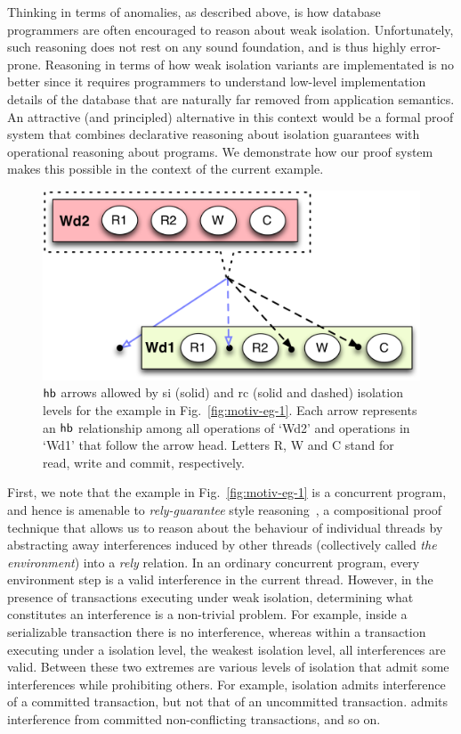 Thinking in terms of anomalies, as described above, is how database
programmers are often encouraged to reason about weak isolation.
Unfortunately, such reasoning does not rest on any sound foundation,
and is thus highly error-prone. Reasoning in terms of how weak
isolation variants are implementated is no better since it requires
programmers to understand low-level implementation details of the
database that are naturally far removed from application semantics. An
attractive (and principled) alternative in this context would be a
formal proof system that combines declarative reasoning about
isolation guarantees with operational reasoning about programs. We
demonstrate how our proof system makes this possible in the context of
the current example.

\begin{figure}
\centering
  \includegraphics[scale=0.4]{Figures/motiv-eg-1-hb}

\caption{$\textsf{hb}$ arrows allowed by {\sc si} (solid) and {\sc rc} (solid
  and dashed) isolation levels for the example in
  Fig.~\ref{fig:motiv-eg-1}. Each arrow represents an $\textsf{hb}$ relationship
  among all operations of `Wd2' and operations in `Wd1' that follow
  the arrow head. Letters R, W and C stand for read, write and commit,
  respectively.}
\label{fig:motiv-eg-1-hb}
\end{figure}

First, we note that the example in Fig.~\ref{fig:motiv-eg-1} is a
concurrent program, and hence is amenable to \emph{rely-guarantee}
style reasoning~\cite{rgjones}, a compositional proof technique that
allows us to reason about the behaviour of individual threads by
abstracting away interferences induced by other threads (collectively
called \emph{the environment}) into a \emph{rely} relation. In an
ordinary concurrent program, every environment step is a valid
interference in the current thread. However, in the presence of
transactions executing under weak isolation, determining what
constitutes an interference is a non-trivial problem. For example,
inside a serializable transaction there is no interference, whereas
within a transaction executing under a 
isolation level, the weakest isolation level, all interferences are
valid. Between these two extremes are various levels of isolation that
admit some interferences while prohibiting others.  For example,
 isolation admits interference of a committed
transaction, but not that of an uncommitted transaction.
 admits interference from committed
non-conflicting transactions, and so on.

